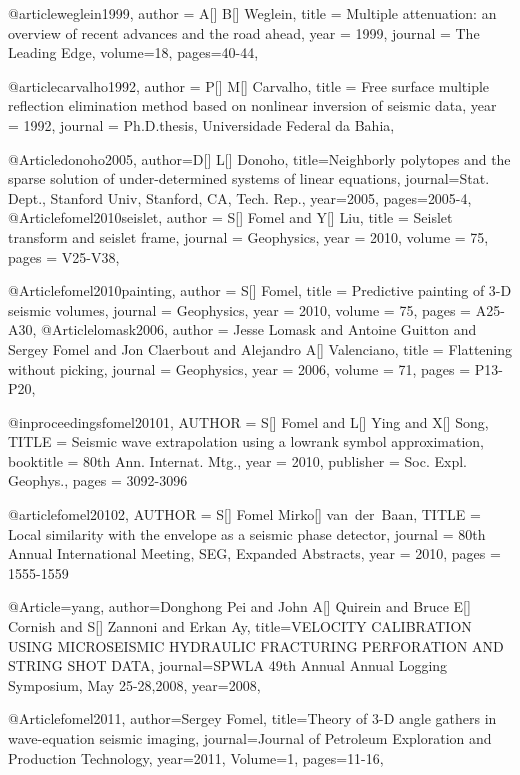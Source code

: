 @article{weglein1999,
  author =	 {A[] B[] Weglein},
  title =	 {Multiple attenuation: an overview of recent advances and the road ahead},
  year =	 1999,
  journal =	 {The Leading Edge},
  volume=18,
 pages=40-44,
}

@article{carvalho1992,
  author =	 {P[] M[] Carvalho},
  title =	 {Free surface multiple reflection elimination method based on nonlinear inversion of seismic data},
  year =	 1992,
  journal =	 {Ph.D.thesis, Universidade Federal da Bahia},
}

@Article{donoho2005,
  author={D[] L[] Donoho},
  title={Neighborly polytopes and the sparse solution of under-determined systems of linear equations},
  journal={Stat. Dept., Stanford Univ, Stanford, CA, Tech. Rep.},
  year=2005,
  pages={2005-4},
}
@Article{fomel2010seislet,
  author = 	 {S[] Fomel and Y[] Liu},
  title = 	 {Seislet transform and seislet frame},
  journal = 	 {Geophysics},
  year = 	 2010,
  volume =	 75,
  pages =	 {V25-V38},
}

@Article{fomel2010painting,
  author = 	 {S[] Fomel},
  title = 	 {Predictive painting of 3-D seismic volumes},
  journal = 	 {Geophysics},
  year = 	 2010,
  volume =	 75,
  pages =	 {A25-A30},
}
@Article{lomask2006,
  author = 	 {Jesse Lomask and Antoine Guitton and Sergey Fomel and Jon Claerbout and Alejandro A[] Valenciano},
  title = 	 {Flattening without picking},
  journal = 	 {Geophysics},
  year = 	 2006,
  volume =	 71,
  pages =	 {P13-P20},
}

@inproceedings{fomel20101,
  AUTHOR = {S[] Fomel and L[] Ying and X[] Song},
  TITLE = {Seismic wave extrapolation using a lowrank symbol approximation},
  booktitle =    {80th Ann. Internat. Mtg.},
  year = 	 {2010},
  publisher =    {Soc. Expl. Geophys.},
  pages = {3092-3096}
}

@article{fomel20102,
  AUTHOR = {S[] Fomel Mirko[] van~der~Baan},
  TITLE = {Local similarity with the envelope as a seismic phase detector},
  journal =    {80th Annual International Meeting, SEG, Expanded Abstracts},
  year = 	 {2010},
  pages = {1555-1559}
}

@Article={yang,
  author={Donghong Pei and John A[] Quirein and Bruce E[] Cornish and S[] Zannoni and Erkan Ay},
  title={VELOCITY CALIBRATION USING MICROSEISMIC HYDRAULIC FRACTURING PERFORATION AND STRING SHOT DATA},
  journal={SPWLA 49th Annual Annual Logging Symposium, May 25-28,2008},
  year=2008,
}


@Article{fomel2011,
  author={Sergey Fomel},
  title={Theory of 3-D angle gathers in wave-equation seismic imaging},
  journal={Journal of Petroleum Exploration and Production Technology},
  year=2011,
  Volume=1,
  pages={11-16},
}


